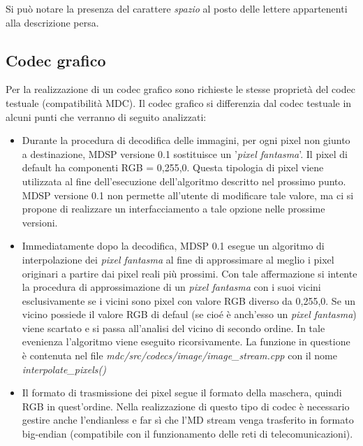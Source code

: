 Si può notare la presenza del carattere \emph{spazio} al posto delle lettere
appartenenti alla descrizione persa.

\subsection{Codec grafico}
Per la realizzazione di un codec grafico sono richieste le stesse proprietà del
codec testuale (compatibilità MDC). Il codec grafico si differenzia dal codec
testuale in alcuni punti che verranno di seguito analizzati:

\begin{itemize}
  \item Durante la procedura di decodifica delle immagini, per ogni pixel
  non giunto a destinazione, MDSP versione 0.1 sostituisce un '\emph{pixel
  fantasma}'. Il pixel di default ha componenti RGB = 0,255,0. Questa
  tipologia di pixel viene utilizzata al fine dell'esecuzione dell'algoritmo
  descritto nel prossimo punto. MDSP versione 0.1 non permette all'utente di
  modificare tale valore, ma ci si propone di realizzare un interfacciamento a tale opzione nelle prossime versioni.
  \item Immediatamente dopo la decodifica, MDSP 0.1 esegue un algoritmo di
  interpolazione dei \emph{pixel fantasma} al fine di approssimare al meglio i
  pixel originari a partire dai pixel reali più prossimi. Con tale affermazione
  si intente la procedura di approssimazione di un \emph{pixel fantasma} con i
  suoi vicini esclusivamente se i vicini sono pixel con valore RGB diverso da
  0,255,0. Se un vicino possiede il valore RGB di defaul (se cioé è anch'esso
  un \emph{pixel fantasma}) viene scartato e si passa all'analisi del vicino di
  secondo ordine. In tale evenienza l'algoritmo viene eseguito ricorsivamente.
  La funzione in questione è contenuta nel file
  \textit{mdc/src/codecs/image/image\_stream.cpp} con il nome
  \textit{interpolate\_pixels()}
  \item Il formato di trasmissione dei pixel segue il formato della maschera,
  quindi RGB in quest'ordine. Nella realizzazione di questo tipo di codec è
  necessario gestire anche l'endianless e far sì che l'MD stream venga
  trasferito in formato big-endian (compatibile con il funzionamento delle reti
  di telecomunicazioni).
\end{itemize}

